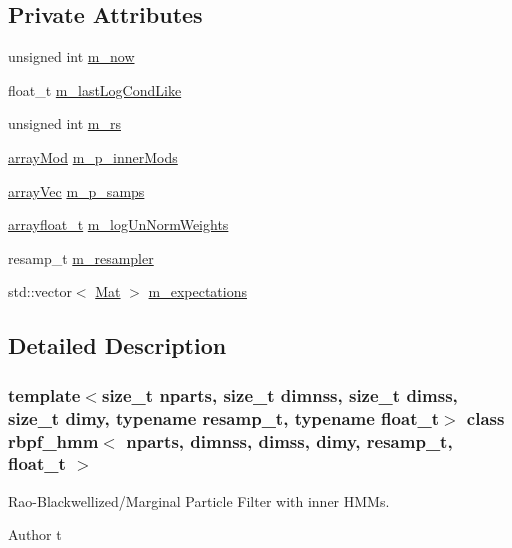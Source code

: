 \subsection*{Private Attributes}
\begin{DoxyCompactItemize}
\item 
unsigned int \hyperlink{classrbpf__hmm_a1405e1f6ce133cf4d0089bb9cc875d0e}{m\+\_\+now}
\item 
float\+\_\+t \hyperlink{classrbpf__hmm_a8b08a5af7f7ef6b0079c69ff0c6b485f}{m\+\_\+last\+Log\+Cond\+Like}
\item 
unsigned int \hyperlink{classrbpf__hmm_ae4f15e5a4f31eefa789fbffd86e78a6b}{m\+\_\+rs}
\item 
\hyperlink{classrbpf__hmm_a6dad2eb9cecbc6a85e348fec442c2998}{array\+Mod} \hyperlink{classrbpf__hmm_a37251f098a509b771e20eae32d779f9d}{m\+\_\+p\+\_\+inner\+Mods}
\item 
\hyperlink{classrbpf__hmm_a2154906d47b4eb987fe7c238d1aace0a}{array\+Vec} \hyperlink{classrbpf__hmm_a6caeb30aae73ee88f4131103dbf1f84b}{m\+\_\+p\+\_\+samps}
\item 
\hyperlink{classrbpf__hmm_aae4e776097278c6e5c25f614d7cad7bd}{arrayfloat\+\_\+t} \hyperlink{classrbpf__hmm_a6dc40d4e2fd23ce66be5473bdaf438a5}{m\+\_\+log\+Un\+Norm\+Weights}
\item 
resamp\+\_\+t \hyperlink{classrbpf__hmm_ab298b91a0da6b09197915e337ca2b8a1}{m\+\_\+resampler}
\item 
std\+::vector$<$ \hyperlink{classrbpf__hmm_ac32aaf9833767d6886f732243a77aa66}{Mat} $>$ \hyperlink{classrbpf__hmm_aedb1b513e10d071735fb5d06295c664b}{m\+\_\+expectations}
\end{DoxyCompactItemize}


\subsection{Detailed Description}
\subsubsection*{template$<$size\+\_\+t nparts, size\+\_\+t dimnss, size\+\_\+t dimss, size\+\_\+t dimy, typename resamp\+\_\+t, typename float\+\_\+t$>$\newline
class rbpf\+\_\+hmm$<$ nparts, dimnss, dimss, dimy, resamp\+\_\+t, float\+\_\+t $>$}

Rao-\/\+Blackwellized/\+Marginal Particle Filter with inner H\+M\+Ms. 

\begin{DoxyAuthor}{Author}
t 
\end{DoxyAuthor}


